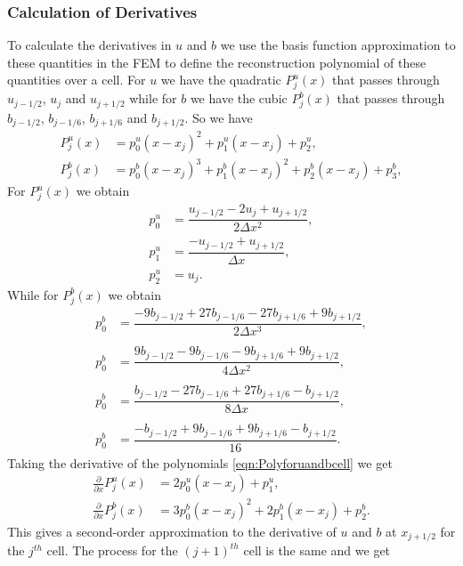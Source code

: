 \subsubsection{Calculation of Derivatives}
To calculate the derivatives in $u$ and $b$ we use the basis function approximation to these quantities in the FEM to define the reconstruction polynomial of these quantities over a cell. For $u$ we have the quadratic $P_j^u(x)$ that passes through $u_{j-1/2}$, $u_j$ and $u_{j+1/2}$ while for $b$ we have the cubic $P_j^b(x)$ that passes through $b_{j-1/2}$, $b_{j-1/6}$, $b_{j+1/6}$ and $b_{j+1/2}$. So we have 
\begin{subequations}
	\begin{align}
	P^u_j(x) &= p^u_0 \left(x - x_j\right)^2 + p^u_1 \left(x - x_j\right) + p^u_2, \\
	P^b_j(x) &= p^b_0 \left(x - x_j\right)^3 + p^b_1 \left(x - x_j\right)^2 + p^b_2 \left(x - x_j\right)  + p^b_3,
	\end{align}
	\label{eqn:Polyforuandbcell}
\end{subequations}
For $P^u_j(x)$ we obtain
\begin{align*}
p^u_0 &=  \dfrac{u_{j-1/2} - 2u_j + u_{j+1/2}}{2 \Delta x^2},\\
p^u_1 &=  \dfrac{-u_{j-1/2} + u_{j+1/2}}{\Delta x},\\
p^u_2 &=  u_j.
\end{align*}
While for $P^b_j(x)$ we obtain
\begin{align*}
p^b_0 &=  \dfrac{-9b_{j-1/2} + 27b_{j-1/6} - 27 b_{j+1/6} + 9b_{j+1/2}}{2 \Delta x^3},\\ \\
p^b_0 &=  \dfrac{9b_{j-1/2} - 9b_{j-1/6} - 9b_{j+1/6} + 9b_{j+1/2}}{4 \Delta x^2},\\ \\ 
p^b_0 &=  \dfrac{b_{j-1/2} - 27b_{j-1/6} + 27 b_{j+1/6} - b_{j+1/2}}{8 \Delta x},\\\\
p^b_0 &=  \dfrac{-b_{j-1/2}  + 9b_{j-1/6} + 9 b_{j+1/6} - b_{j+1/2}}{16}.
\end{align*}
Taking the derivative of the polynomials \eqref{eqn:Polyforuandbcell} we get
	\begin{align*}
	\frac{\partial }{\partial x}P^u_j(x) &= 2p^u_0 \left(x - x_j\right) + p^u_1, \\
	\frac{\partial }{\partial x}P^b_j(x) &= 3p^b_0 \left(x - x_j\right)^2 + 2p^b_1 \left(x - x_j\right) + p^b_2.
	\end{align*}
This gives a second-order approximation to the derivative of $u$ and $b$ at $x_{j+1/2}$ for the $j^{th}$ cell. The process for the $(j+1)^{th}$ cell is the same and we get 

